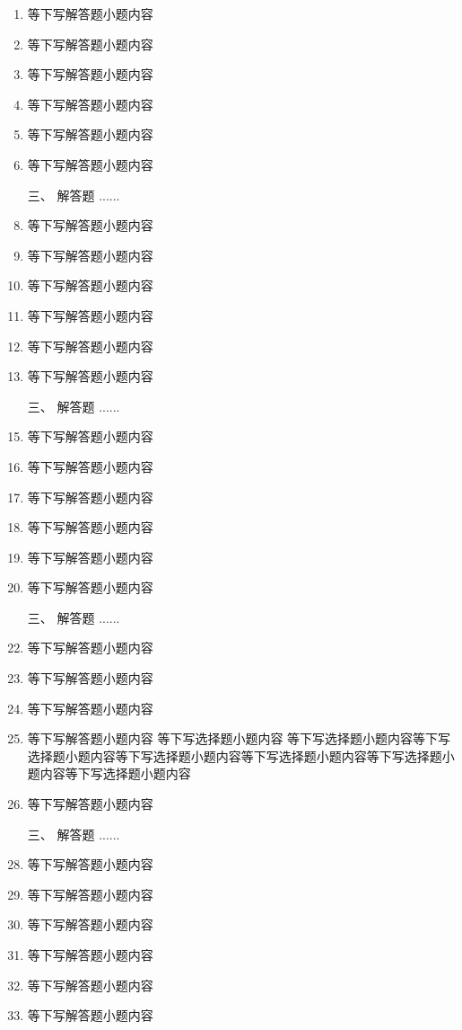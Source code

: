 \documentclass[12pt,twocolumn,landscape,UTF8,twoside]{ctexart}
\begin{document}
\begin{spacing}{1.3}
\begin{enumerate} [1、]
		\item 等下写解答题小题内容 
		\item 等下写解答题小题内容 
		\item 等下写解答题小题内容 
		\item 等下写解答题小题内容 
		\item 等下写解答题小题内容 
		\item 等下写解答题小题内容  		
		\item[\heiti 三、] {\heiti 解答题  ......}
		\item 等下写解答题小题内容 
		\item 等下写解答题小题内容 
		\item 等下写解答题小题内容 
		\item 等下写解答题小题内容 
		\item 等下写解答题小题内容 
		\item 等下写解答题小题内容  		
		\item[\heiti 三、] {\heiti 解答题  ......}
		\item 等下写解答题小题内容 
		\item 等下写解答题小题内容 
		\item 等下写解答题小题内容 
		\item 等下写解答题小题内容 
		\item 等下写解答题小题内容 
		\item 等下写解答题小题内容  		
		\item[\heiti 三、] {\heiti 解答题  ......}
		\item 等下写解答题小题内容 
		\item 等下写解答题小题内容 
		\item 等下写解答题小题内容 
		\item 等下写解答题小题内容 等下写选择题小题内容 等下写选择题小题内容等下写选择题小题内容等下写选择题小题内容等下写选择题小题内容等下写选择题小题内容等下写选择题小题内容
		\item 等下写解答题小题内容  		
		\item[\heiti 三、] {\heiti 解答题  ......}
		\item 等下写解答题小题内容 
		\item 等下写解答题小题内容 
		\item 等下写解答题小题内容 
		\item 等下写解答题小题内容 
		\item 等下写解答题小题内容 
		\item 等下写解答题小题内容  		

\end{enumerate}
\end{spacing}
\end{document}
